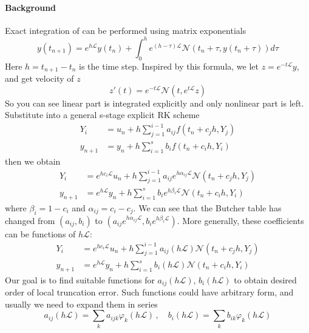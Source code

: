 \paragraph{Background}
Exact integration of  can be performed
using matrix exponentials
\begin{equation}
  \label{eq:SLexact}
  y(t_{n+1}) = e^{h\mathcal{L}}y(t_n) + \int_0^h e^{(h-\tau)\mathcal{L}}
  \mathcal{N}(t_n+\tau, y(t_n+\tau)) d\tau
\end{equation}
Here $h = t_{n+1} - t_n$ is the time step.
Inspired by this formula, we let $z=e^{-t\mathcal{L}}y$, and get velocity of $z$
\begin{equation}
  \label{eq:slz}
  z'(t) = e^{-t\mathcal{L}}\mathcal{N}(t, e^{t\mathcal{L}}z)
\end{equation}
So you can see linear part is integrated explicitly and only nonlinear part is left.
Substitute  into a general s-stage explicit RK scheme
\begin{align*}
  Y_i & = u_n + h\sum_{j=1}^{i-1} a_{ij}f(t_n + c_jh, Y_j) \\
  y_{n+1} & = y_n + h\sum_{i=1}^{s} b_i f(t_n + c_ih, Y_i)
\end{align*}
then we obtain
\begin{align*}
  Y_i & = e^{hc_i\mathcal{L}}u_n + h\sum_{j=1}^{i-1} a_{ij}e^{h\alpha_{ij}\mathcal{L}}
        \mathcal{N}(t_n + c_jh, Y_j) \\
  y_{n+1} & = e^{h\mathcal{L}}y_n + h\sum_{i=1}^{s} b_i e^{h\beta_i\mathcal{L}}
            \mathcal{N}(t_n + c_ih, Y_i)
\end{align*}
where $\beta_i=1-c_i$ and $\alpha_{ij}=c_i-c_j$. We can see that the Butcher table
has changed from $(a_{ij}, b_i)$ to
$(a_{ij}e^{h\alpha_{ij}\mathcal{L}}, b_i e^{h\beta_i\mathcal{L}})$. More generally, these
coefficients can be functions of $h\mathcal{L}$:
\begin{align}
  Y_i & = e^{hc_i\mathcal{L}}u_n + h\sum_{j=1}^{i-1} a_{ij}(h\mathcal{L})
        \mathcal{N}(t_n + c_jh, Y_j) \label{eq:ETDRKa}\\
  y_{n+1} & = e^{h\mathcal{L}}y_n + h\sum_{i=1}^{s} b_i(h\mathcal{L})
            \mathcal{N}(t_n + c_ih, Y_i) \label{eq:ETDRKb}
\end{align}
Our goal is to find suitable functions for $a_{ij}(h\mathcal{L})$,
$b_i(h\mathcal{L})$ to obtain desired order of local truncation error.
Such functions could have arbitrary form, and usually we need to expand
them in series
\[
a_{ij}(h\mathcal{L}) = \sum_{k} a_{ijk}\varphi_{k}(h\mathcal{L})\,,\quad
b_{i}(h\mathcal{L}) = \sum_{k} b_{ik}\varphi_{k}(h\mathcal{L})
\]
